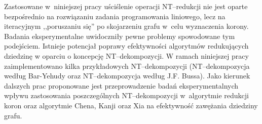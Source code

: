   Zastosowane w~niniejszej pracy uściślenie operacji NT--redukcji nie jest oparte bezpośrednio na rozwiązaniu zadania programowania liniowego, lecz na iteracyjnym ,,poruszaniu się'' po skojarzeniu grafu w~celu wyznaczenia korony.
  Badania eksperymentalne uwidoczniły pewne problemy spowodowane tym podejściem.
  Istnieje potencjał poprawy efektywności algorytmów redukujących dziedzinę w oparciu o koncepcję NT--dekompozycji.
  W ramach niniejszej pracy zaimplementowano kilka przykładowych NT--dekompozycji (NT--dekompozycja według Bar-Yehudy oraz NT--dekompozycja według J.F. Bussa).
  Jako kierunek dalszych prac proponowane jest przeprowadzenie badań eksperymentalnych wpływu zastosowania poszczególnych NT--dekompozycji w~algorytmie redukcji koron oraz algorytmie Chena, Kanji oraz Xia na efektywność zawężania dziedziny grafu.